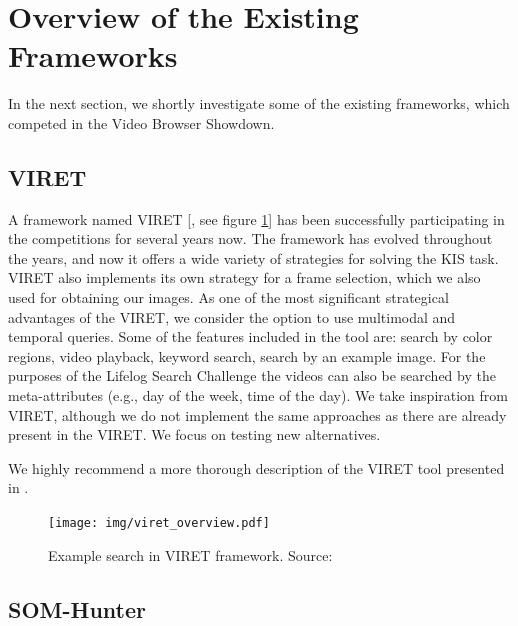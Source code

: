 \section{Overview of the Existing Frameworks}

In the next section, we shortly investigate some of the existing frameworks, which competed in the Video Browser Showdown. 

\subsection{VIRET}

A framework named VIRET [\cite{lokovc2019framework, lokovc2019viret}, see figure \ref{fig:viret}] has been successfully participating in the competitions for several years now. The framework has evolved throughout the years, and now it offers a wide variety of strategies for solving the KIS task. VIRET also implements its own strategy for a frame selection, which we also used for obtaining our images. As one of the most significant strategical advantages of the VIRET, we consider the option to use multimodal and temporal queries. Some of the features included in the tool are: search by color regions, video playback, keyword search, search by an example image. For the purposes of the Lifelog Search Challenge \citep{LSC20} the videos can also be searched by the meta-attributes (e.g., day of the week, time of the day). We take inspiration from VIRET, although we do not implement the same approaches as there are already present in the VIRET. We focus on testing new alternatives.

We highly recommend a more thorough description of the VIRET tool presented in \cite{kovalvcik2020viret}.

\begin{figure}
    \centering
    \texttt{[image: img/viret\_overview.pdf]}
    \caption[Example search in VIRET framework]{Example search in VIRET framework. Source: \cite{kovalvcik2020viret}}
    \label{fig:viret}
\end{figure}

\subsection{SOM-Hunter}

